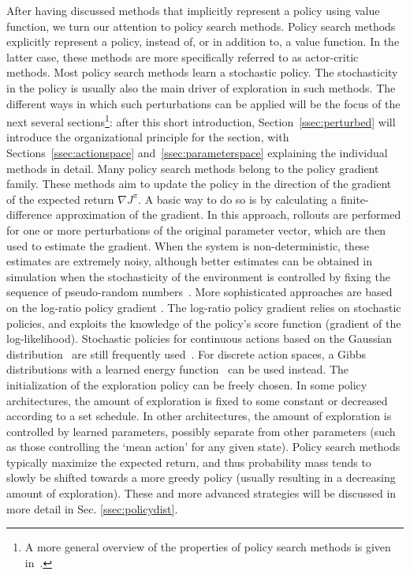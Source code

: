 \label{sec:value-policy-search}
After having discussed methods that implicitly represent a policy using value function, we turn our attention to policy search methods.
Policy search methods explicitly represent a policy, instead of, or in addition to, a value function. In the latter case, these methods are more specifically referred to as actor-critic methods. Most policy search methods learn a stochastic policy. The stochasticity in the policy is usually also the main driver of exploration in such methods.  The different ways in which such perturbations can be applied will be the focus of the next several sections\footnote{A more general overview of the properties of policy search methods is given in~.}: after this short introduction, Section~\ref{ssec:perturbed} will introduce the organizational principle for the section, with Sections~\ref{ssec:actionspace} and~\ref{ssec:parameterspace} explaining the individual methods in detail. 
Many policy search methods belong to the policy gradient family. These methods aim to update the policy in the direction of the gradient of the expected return $\nabla J^\pi$. A basic way to do so is by calculating a finite-difference approximation of the gradient. In this approach, rollouts are performed for one or more perturbations of the original parameter vector, which are then used to estimate the gradient. When the system is non-deterministic, these estimates are extremely noisy, although better estimates can be obtained in simulation when the stochasticity of the environment is controlled by fixing the sequence of pseudo-random numbers~. 
More sophisticated approaches are based on the log-ratio policy gradient . The log-ratio policy gradient relies on stochastic policies, and exploits the knowledge of the policy's score function (gradient of the log-likelihood). Stochastic policies for continuous actions based on the Gaussian distribution~ are still frequently used~. For discrete action spaces, a Gibbs distributions with a learned energy function~ can be used instead.
The initialization of the exploration policy can be freely chosen. In some policy architectures, the amount of exploration is fixed to some constant or decreased according to a set schedule. In other architectures, the amount of exploration is controlled by learned parameters, possibly separate from other  parameters (such as those controlling the `mean action' for any given state).  Policy search methods typically maximize the expected return, and thus probability mass tends to slowly be shifted towards a more greedy policy (usually resulting in a decreasing amount of exploration). These and more advanced strategies will be discussed in more detail in Sec. \ref{ssec:policydist}. 
